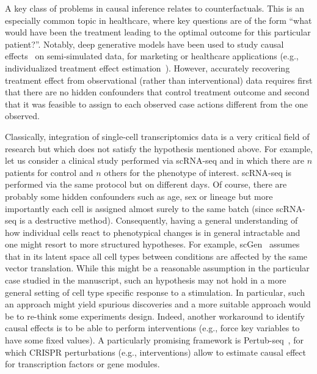 A key class of problems in causal inference relates to counterfactuals. This is an especially common topic in healthcare, where key questions are of the form ``what would have been the treatment leading to the optimal outcome for this particular patient?''. Notably, deep generative models have been used to study causal effects~\cite{pearl2009causality} on semi-simulated data, for marketing or healthcare applications (e.g., individualized treatment effect estimation~\cite{Louizos2017, yoon2018ganite, lopez.cost}). However, accurately recovering treatment effect from observational (rather than interventional) data requires first that there are no hidden confounders that control treatment outcome and second that it was feasible to assign to each observed case actions different from the one observed. 

Classically, integration of single-cell transcriptomics data is a very critical field of research but which does not satisfy the hypothesis mentioned above. For example, let us consider a clinical study performed via scRNA-seq and in which there are $n$ patients for control and $n$ others for the phenotype of interest. scRNA-seq is performed via the same protocol but on different days. Of course, there are probably some hidden confounders such as age, sex or lineage but more importantly each cell is assigned almost surely to the same batch (since scRNA-seq is a destructive method). Consequently, having a general understanding of how individual cells react to phenotypical changes is in general intractable and one might resort to more structured hypotheses. For example, scGen~\cite{Lotfollahi2018} assumes that in its latent space all cell types between conditions are affected by the same vector translation. While this might be a reasonable assumption in the particular case studied in the manuscript, such an hypothesis may not hold in a more general setting of cell type specific response to a stimulation. In particular, such an approach might yield spurious discoveries and a more suitable approach would be to re-think some experiments design. Indeed, another workaround to identify causal effects is to be able to perform interventions (e.g., force key variables to have some fixed values). A particularly promising framework is Pertub-seq~\cite{Dixit2016}, for which CRISPR perturbations (e.g., interventions) allow to estimate causal effect for transcription factors or gene modules.   
